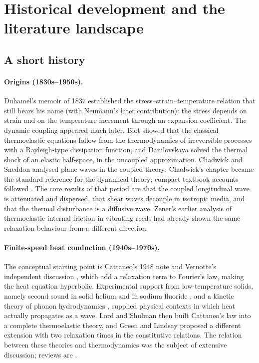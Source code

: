 \section{Historical development and the literature landscape}\label{sec:history}
\subsection{A short history}
\paragraph{Origins (1830s--1950s).} Duhamel's memoir of 1837 \citep{Duhamel1837} established the stress--strain--temperature relation that still bears his name (with Neumann's later contribution): the stress depends on strain and on the temperature increment through an expansion coefficient. The dynamic coupling appeared much later. Biot \citep{Biot1956} showed that the classical thermoelastic equations follow from the thermodynamics of irreversible processes with a Rayleigh-type dissipation function, and Danilovskaya \citep{Danilovskaya1950} solved the thermal shock of an elastic half-space, in the uncoupled approximation. Chadwick and Sneddon \citep{ChadwickSneddon1958} analysed plane waves in the coupled theory; Chadwick's chapter \citep{Chadwick1960} became the standard reference for the dynamical theory; compact textbook accounts followed \citep{Boley1960,Nowacki1975,Carlson1972}. The core results of that period are that the coupled longitudinal wave is attenuated and dispersed, that shear waves decouple in isotropic media, and that the thermal disturbance is a diffusive wave. Zener's earlier analysis of thermoelastic internal friction in vibrating reeds \citep{Zener1937} had already shown the same relaxation behaviour from a different direction.

\paragraph{Finite-speed heat conduction (1940s--1970s).} The conceptual starting point is Cattaneo's 1948 note \citep{Cattaneo1948} and Vernotte's independent discussion \citep{Vernotte1958}, which add a relaxation term to Fourier's law, making the heat equation hyperbolic. Experimental support from low-temperature solids, namely second sound in solid helium and in sodium fluoride \citep{Ackerman1966,Jackson1970}, and a kinetic theory of phonon hydrodynamics \citep{GuyerKrumhansl1966,GuyerKrumhansl1966II,Chester1963}, supplied physical contexts in which heat actually propagates as a wave. Lord and Shulman \citep{Lord1967} then built Cattaneo's law into a complete thermoelastic theory, and Green and Lindsay \citep{Green1972} proposed a different extension with two relaxation times in the constitutive relations. The relation between these theories and thermodynamics was the subject of extensive discussion; reviews are \citep{Chandrasekharaiah1986,Joseph1989,Joseph1990}.

